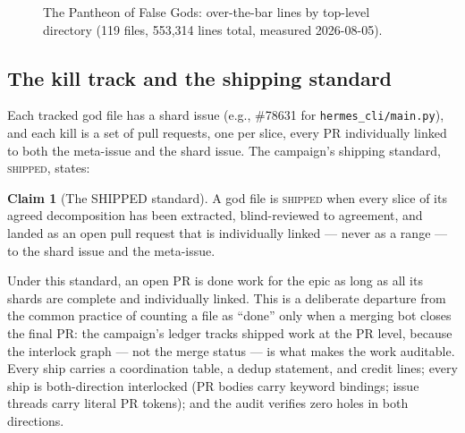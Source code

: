 \documentclass[11pt]{article}
\theoremstyle{definition}
\newtheorem{claim}{Claim}
\theoremstyle{plain}
\theoremstyle{remark}
\begin{document}
\begin{figure}[H]
\centering
{}
\caption{The Pantheon of False Gods: over-the-bar lines by top-level
directory (119 files, 553{,}314 lines total, measured 2026-08-05).}
\label{fig:pantheon}
\end{figure}

\subsection{The kill track and the shipping standard}

Each tracked god file has a shard issue (e.g., \#78631 for
\texttt{hermes\_cli/main.py}), and each kill is a set of pull requests, one
per slice, every PR individually linked to both the meta-issue and the shard
issue. The campaign's shipping standard, \textsc{shipped}, states:

\begin{claim}[The SHIPPED standard]
\label{cl:shipped}
A god file is \textsc{shipped} when every slice of its agreed decomposition
has been extracted, blind-reviewed to agreement, and landed as an open pull
request that is individually linked --- never as a range --- to the shard
issue and the meta-issue.
\end{claim}

Under this standard, an open PR is done work for the epic as long as all its
shards are complete and individually linked. This is a deliberate departure
from the common practice of counting a file as ``done'' only when a merging
bot closes the final PR: the campaign's ledger tracks shipped work at the PR
level, because the interlock graph --- not the merge status --- is what makes
the work auditable. Every ship carries a coordination table, a dedup
statement, and credit lines; every ship is both-direction interlocked (PR
bodies carry keyword bindings; issue threads carry literal PR tokens); and
the audit verifies zero holes in both directions.
\end{document}
